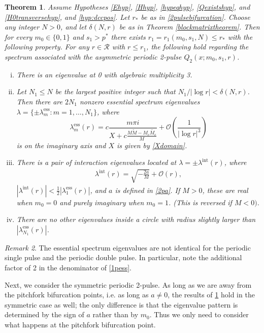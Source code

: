 \documentclass[11pt,reqno]{amsart}
\theoremstyle{plain}
\newtheorem{theorem}{Theorem}
\theoremstyle{definition}
\theoremstyle{remark}
\newtheorem{remark}[theorem]{Remark}
\begin{document}
\begin{theorem}\label{theorem:2peigsassym}
Assume Hypotheses \ref{Ehyp}, \ref{Hhyp}, \ref{hypeqhyp}, \ref{Qexistshyp}, and \ref{H0transversehyp}, and \ref{hyp:dccpos}. Let $r_*$ be as in \cref{2pulsebifurcation}. Choose any integer $N > 0$, and let $\delta(N,r)$ be as in Theorem \ref{blockmatrixtheorem}. Then for every $m_0 \in \{0, 1\}$ and $s_1 > p^*$ there exists $r_1 = r_1(m_0, s_1, N) \leq r_*$ with the following property. For any $r \in \mathcal{R}$ with $r \leq r_1$, the following hold regarding the spectrum associated with the asymmetric periodic 2-pulse $Q_2(x; m_0, s_1, r)$.

\begin{enumerate}[(i)]
\item There is an eigenvalue at 0 with algebraic multiplicity 3. 
\item Let $N_1 \leq N$ be the largest positive integer such that $N_1/|\log r| < \delta(N,r)$. Then there are $2N_1$ nonzero essential spectrum eigenvalues $\lambda = \{ \pm \lambda_m^{\text{ess}} : m = 1, \dots, N_1 \}$, where
\[
\lambda_m^{\text{ess}}(r) = c \frac{m \pi i}{X + c \frac{M\tilde{M} - M_c\tilde{M_c}}{M}} +  \mathcal{O}\left( \frac{1}{|\log r|^3} \right)
\]
is on the imaginary axis and $X$ is given by \cref{Xdomain}.

\item There is a pair of interaction eigenvalues located at $\lambda = \pm \lambda^{\text{int}}(r)$, where
	\begin{align*}
	\lambda^{\text{int}}(r) =  \sqrt{-\frac{2a}{M}} + \mathcal{O}\left( r \right),
	\end{align*}
$|\lambda^{\text{int}}(r)| < \frac{1}{2}|\lambda_1^{\text{ess}}(r)|$, and $a$ is defined in \cref{2pa}. If $M > 0$, these are real when $m_0 = 0$ and purely imaginary when $m_0 = 1$. (This is reversed if $M < 0)$. 
\item There are no other eigenvalues inside a circle with radius slightly larger than $|\lambda_{N_1}^{\text{ess}}(r)|$.
\end{enumerate}
\end{theorem}

\begin{remark}The essential spectrum eigenvalues are not identical for the periodic single pulse and the periodic double pulse. In particular, note the additional factor of 2 in the denominator of \cref{1pess}.
\end{remark}

Next, we consider the symmetric periodic 2-pulse. As long as we are away from the pitchfork bifurcation points, i.e. as long as $a \neq 0$, the results of \cref{theorem:2peigsassym} hold in the symmetric case as well; the only difference is that the eigenvalue pattern is determined by the sign of $a$ rather than by $m_0$. Thus we only need to consider what happens at the pitchfork bifurcation point.
\end{document}
